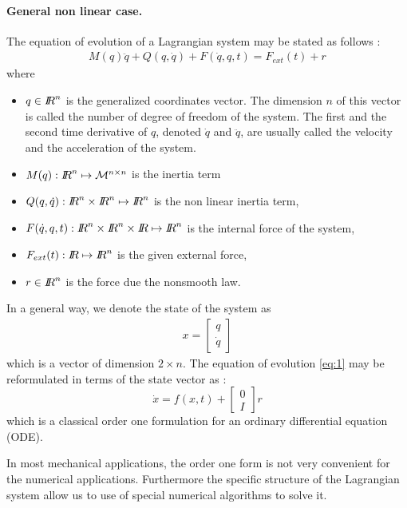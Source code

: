 \documentclass[10pt]{article}
\begin{document}
\paragraph{General non linear case.} The equation of evolution of a Lagrangian system may be stated as follows :
\begin{eqnarray}
  \label{eq:1}
  M(q)\ddot q + Q(q,\dot q) + F(\dot q, q , t) = F_{ext}(t) + r
\end{eqnarray}
where 
\begin{itemize}
\item $q \in \mbox{\rm $I\!\!R$}^n$ is the generalized coordinates vector. The dimension $n$  of this vector is called  the number of degree of freedom of the system. The first and the second time derivative of $q$, denoted $\dot q$ and $\ddot q$, are usually called the velocity and the acceleration of the system.
\item $M(q): \mbox{\rm $I\!\!R$}^n \mapsto \mathcal M^{n\times n}$ is the inertia term 
\item $Q(q,\dot q ): \mbox{\rm $I\!\!R$}^n \times \mbox{\rm $I\!\!R$}^n \mapsto \mathcal {\mbox{\rm $I\!\!R$}}^{n}$ is the non linear inertia term,
\item $F(\dot q, q , t) : \RR^n \times \RR^n \times \RR \mapsto \mathcal \RR^{n}$ is the internal force of the system,
\item $F_{ext}(t):  \mbox{\rm $I\!\!R$} \mapsto \mathcal {\mbox{\rm $I\!\!R$}}^{n}  $  is the given external force,
\item $r \in \mbox{\rm $I\!\!R$}^n$ is the force due the nonsmooth law.
\end{itemize}


In a general way, we denote the state of the system as 
\begin{eqnarray}
  x =  \left[\begin{array}{c}
  q \\
  \dot q
  \end{array}\right] 
\end{eqnarray}
which is a vector of dimension $2\times n$.  The equation of evolution \eqref{eq:1} may be reformulated in terms of the state vector as :
\begin{equation}
  \label{eq:2}
\dot x =f (x,t) +  \left[\begin{array}{c}
  0 \\
  I
  \end{array}\right] r
\end{equation}
which is a classical order one formulation for an ordinary differential equation (ODE).

\begin{remark}
In most mechanical applications, the order one form is not very convenient for the  numerical applications.  Furthermore the specific structure of the Lagrangian system allow us to use of special numerical algorithms to solve it. 
\end{remark}
\end{document}
